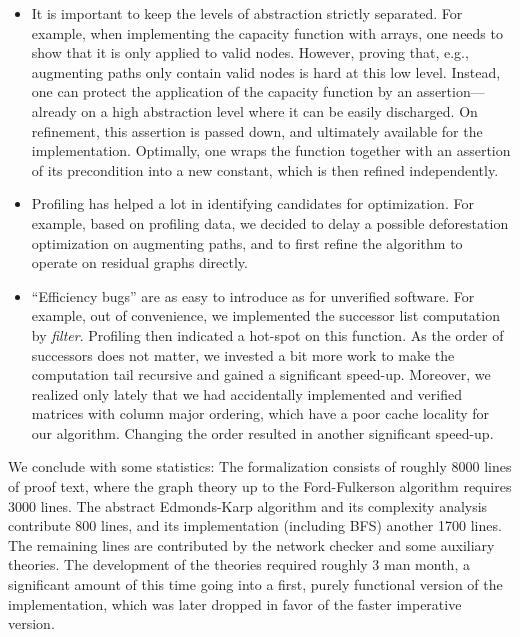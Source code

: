 \documentclass[11pt,a4paper]{article}
\begin{document}
  \begin{itemize} 
  \item
  It is important to keep the levels of abstraction strictly separated. For
  example, when implementing the capacity function with arrays, one needs to
  show that it is only applied to valid nodes. However, proving that, e.g.,
  augmenting paths only contain valid nodes is hard at this low level. Instead,
  one can protect the application of the capacity function by an assertion---
  already on a high abstraction level where it can be easily discharged. On
  refinement, this assertion is passed down, and ultimately available for the
  implementation. Optimally, one wraps the function together with an assertion
  of its precondition into a new constant, which is then refined independently.
  \item Profiling has helped a lot in identifying candidates for optimization.
  For example, based on profiling data, we decided to delay a possible
  deforestation optimization on augmenting paths, and to first refine the
  algorithm to operate on residual graphs directly. 
  \item ``Efficiency bugs''
  are as easy to introduce as for unverified software. For example, out of
  convenience, we implemented the successor list computation by \emph{filter}.
  Profiling then indicated a hot-spot on this function. As the order of
  successors does not matter, we invested a bit more work to make the
  computation tail recursive and gained a significant speed-up. Moreover, we
  realized only lately that we had accidentally implemented and verified
  matrices with column major ordering, which have a poor cache locality for our
  algorithm. Changing the order resulted in another significant speed-up.
  \end{itemize} 
  We conclude with some statistics: The formalization consists of
  roughly 8000 lines of proof text, where the graph theory up to the
  Ford-Fulkerson algorithm requires 3000 lines. The abstract Edmonds-Karp
  algorithm and its complexity analysis contribute 800 lines, and its
  implementation (including BFS) another 1700 lines. The remaining lines are
  contributed by the network checker and some auxiliary theories. The
  development of the theories required roughly 3 man month, a significant amount
  of this time going into a first, purely functional version of the
  implementation, which was later dropped in favor of the faster imperative
  version. 
\end{document}
